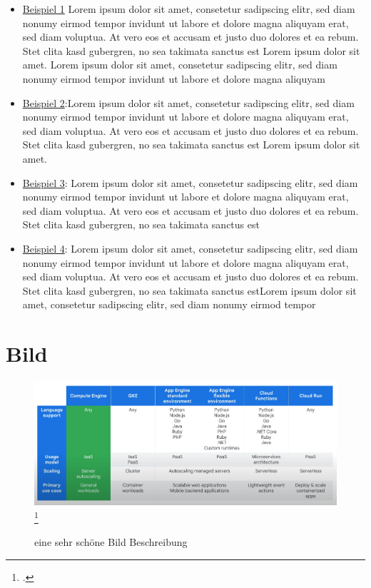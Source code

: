 \documentclass[12pt, oneside]{article}  		%
\begin{document}
\begin{spacing}{1.5}
\begin{itemize}
	\item \ul{Beispiel 1} Lorem ipsum dolor sit amet, consetetur sadipscing elitr, sed diam nonumy eirmod tempor invidunt ut labore et dolore magna aliquyam erat, sed diam voluptua. At vero eos et accusam et justo duo dolores et ea rebum. Stet clita kasd gubergren, no sea takimata sanctus est Lorem ipsum dolor sit amet. Lorem ipsum dolor sit amet, consetetur sadipscing elitr, sed diam nonumy eirmod tempor invidunt ut labore et dolore magna aliquyam
	\item \ul{Beispiel 2}:Lorem ipsum dolor sit amet, consetetur sadipscing elitr, sed diam nonumy eirmod tempor invidunt ut labore et dolore magna aliquyam erat, sed diam voluptua. At vero eos et accusam et justo duo dolores et ea rebum. Stet clita kasd gubergren, no sea takimata sanctus est Lorem ipsum dolor sit amet.
	\item \ul{Beispiel 3}: Lorem ipsum dolor sit amet, consetetur sadipscing elitr, sed diam nonumy eirmod tempor invidunt ut labore et dolore magna aliquyam erat, sed diam voluptua. At vero eos et accusam et justo duo dolores et ea rebum. Stet clita kasd gubergren, no sea takimata sanctus est
	\item \ul{Beispiel 4}: Lorem ipsum dolor sit amet, consetetur sadipscing elitr, sed diam nonumy eirmod tempor invidunt ut labore et dolore magna aliquyam erat, sed diam voluptua. At vero eos et accusam et justo duo dolores et ea rebum. Stet clita kasd gubergren, no sea takimata sanctus estLorem ipsum dolor sit amet, consetetur sadipscing elitr, sed diam nonumy eirmod tempor 
\end{itemize}


\section{Bild}

\begin{figure}[h]
  \centering
  
    \includegraphics[scale=0.28]{img/Google_cloud_compute_and_processing_options}
  	\footcite{GoogleCloudSkillsBoost.22.04.2024}
  \caption{eine sehr schöne Bild Beschreibung  }
  \label{fig:M1}
\end{figure}



\end{spacing}
\end{document}
